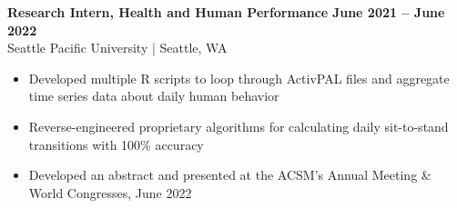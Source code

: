 \textbf{Research Intern, Health and Human Performance} \hfill \textbf{June 2021 -- June 2022}\\
    Seattle Pacific University | Seattle, WA
    \squish
    \begin{itemize}
        \item Developed multiple R scripts to loop through ActivPAL files and aggregate time series data about daily human behavior
        \item Reverse-engineered proprietary algorithms for calculating daily sit-to-stand transitions with 100\% accuracy
        \item Developed an abstract and presented at the ACSM's Annual Meeting \& World Congresses, June 2022
    \end{itemize}